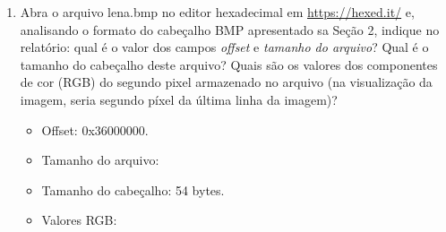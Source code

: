 \documentclass[12pt, a4paper, oneside]{abntex2}
\begin{document}
    \printcoverufsc

    \begin{enumerate}
        \item Abra o arquivo lena.bmp no editor hexadecimal em \href{https://hexed.it/}{https://hexed.it/} e, analisando o formato do cabeçalho BMP apresentado sa Seção 2, indique no relatório: qual é o valor dos campos \textit{offset} e \textit{tamanho do arquivo}?
            Qual é o tamanho do cabeçalho deste arquivo?
            Quais são os valores dos componentes de cor (RGB) do segundo pixel armazenado no arquivo (na visualização da imagem, seria segundo píxel da última linha da imagem)?

            \begin{itemize}
                \item Offset: 0x36000000.
                \item Tamanho do arquivo:
                \item Tamanho do cabeçalho: 54 bytes.
                \item Valores RGB:
            \end{itemize}


    \end{enumerate}
\end{document}
